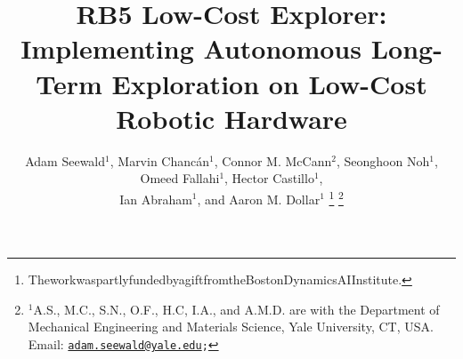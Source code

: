 \documentclass[letterpaper,10pt,conference,twoside]{IEEEtran}
\theoremstyle{definition}
\begin{document}

\title{\LARGE\bf RB5 Low-Cost Explorer: Implementing Autonomous Long-Term Exploration on Low-Cost Robotic Hardware}%

\author{Adam Seewald${}^\text{1}$, Marvin Chanc{\'a}n${}^\text{1}$, Connor M. McCann${}^\text{2}$, Seonghoon Noh${}^\text{1}$, Omeed Fallahi${}^\text{1}$, Hector Castillo${}^\text{1}$,\\ %
Ian Abraham${}^\text{1}$, and Aaron M. Dollar${}^\text{1}$%
  \thanks{The\hspace*{.35ex}work\hspace*{.35ex}was\hspace*{.35ex}partly\hspace*{.35ex}funded\hspace*{.4ex}by\hspace*{.4ex}a\hspace*{.35ex}gift\hspace*{.4ex}from\hspace*{.4ex}the\hspace*{.35ex}Boston\hspace*{.35ex}Dynamics\hspace*{.35ex}AI\hspace*{.4ex}Institute.}
  \thanks{${}^\text{1}$A.\hspace*{.4ex}S., M.\hspace*{.4ex}C., S.\hspace*{.4ex}N., O.\hspace*{.4ex}F., H.\hspace*{.4ex}C, I.\hspace*{.4ex}A., and A.\hspace*{.4ex}M.\hspace*{.4ex}D. are with the Department of Mechanical Engineering and Materials Science, Yale University, CT, USA. Email: {\tt\footnotesize \href{mailto:adam.seewald@yale.edu}{adam.seewald@yale.edu};}}
}
\end{document}
